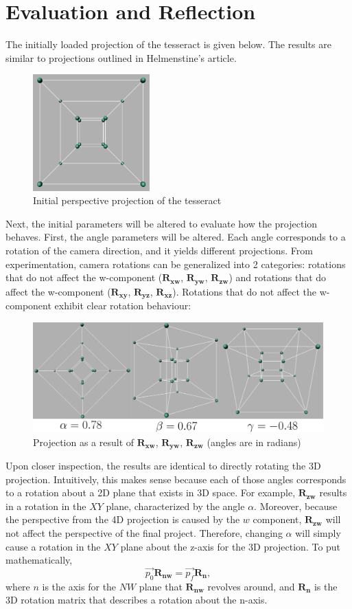 \documentclass[12pt, letterpaper]{article}
\begin{document}
\section{Evaluation and Reflection}
The initially loaded projection of the tesseract is given below. The results are similar to projections outlined in Helmenstine's article.
\begin{figure}[H]
\centering
\includegraphics[width=4.5cm]{initial_tesseract.png}
\caption{Initial perspective projection of the tesseract}
\label{fig:figure}
\end{figure}

Next, the initial parameters will be altered to evaluate how the projection behaves. First, the angle parameters will be altered. Each angle corresponds to a rotation of the camera direction, and it yields different projections. From experimentation, camera rotations can be generalized into 2 categories: rotations that do not affect the w-component ($\mathbf{R_{xw}}$, $\mathbf{R_{yw}}$, $\mathbf{R_{zw}}$) and rotations that do affect the w-component ($\mathbf{R_{xy}}$, $\mathbf{R_{yz}}$, $\mathbf{R_{xz}}$). Rotations that do not affect the w-component exhibit clear rotation behaviour: 
\begin{figure}[H]
\centering
\includegraphics[width=13cm]{4D_rotation_no_W.png}
\caption{Projection as a result of $\mathbf{R_{xw}}$, $\mathbf{R_{yw}}$, $\mathbf{R_{zw}}$ (angles are in radians)}
\label{fig:figure}
\end{figure}
Upon closer inspection, the results are identical to directly rotating the 3D projection. Intuitively, this makes sense because each of those angles corresponds to a rotation about a 2D plane that exists in 3D space. For example, $\mathbf{R_{zw}}$ results in a rotation in the $XY$ plane, characterized by the angle $\alpha$. Moreover, because the perspective from the 4D projection is caused by the $w$ component, $\mathbf{R_{zw}}$ will not affect the perspective of the final project. Therefore, changing $\alpha$ will simply cause a rotation in the $XY$ plane about the z-axis for the 3D projection. To put mathematically, 
$$\vec{p_0}\mathbf{R_{nw}} = \vec{p_f}\mathbf{R_{n}},$$
where $n$ is the axis for the $NW$ plane that $\mathbf{R_{nw}}$ revolves around, and $\mathbf{R_{n}}$ is the 3D rotation matrix that describes a rotation about the n-axis.
\end{document}
